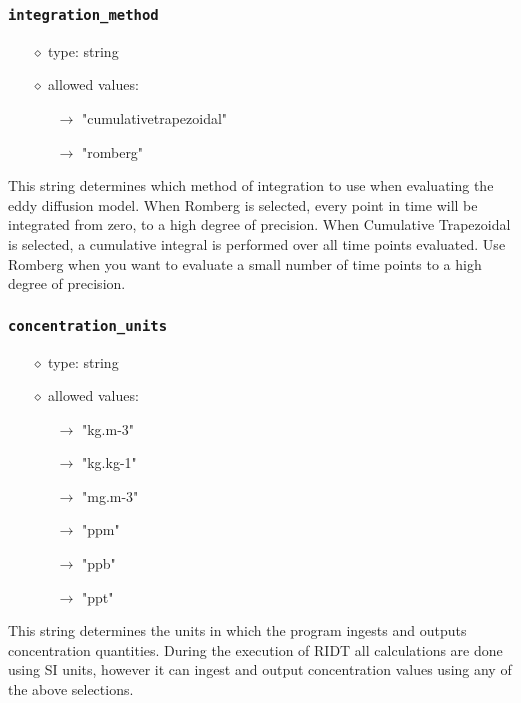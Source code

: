 \documentclass[]{article}
\def\code#1{\texttt{#1}}
\begin{document}
\subsubsection{\code{integration\_method}}\label{sec:integrationmethod}
\begin{itemize}
    \item[$\diamond$] type: string 
    \item[$\diamond$] allowed values:
    \begin{itemize}
        \item[$\rightarrow$] "cumulativetrapezoidal"
        \item[$\rightarrow$] "romberg"
    \end{itemize}
\end{itemize}
This string determines which method of integration to use when evaluating the
eddy diffusion model. When Romberg is selected, every point in time will be
integrated from zero, to a high degree of precision. When Cumulative Trapezoidal
is selected, a cumulative integral is performed over all time points evaluated.
Use Romberg when you want to evaluate a small number of time points to a high
degree of precision.


\subsubsection{\code{concentration\_units}}\label{sec:concentrationunits}
\begin{itemize}
    \item[$\diamond$] type: string 
    \item[$\diamond$] allowed values:
    \begin{itemize}
        \item[$\rightarrow$] "kg.m-3"
        \item[$\rightarrow$] "kg.kg-1"
        \item[$\rightarrow$] "mg.m-3"
        \item[$\rightarrow$] "ppm"
        \item[$\rightarrow$] "ppb"
        \item[$\rightarrow$] "ppt"
    \end{itemize}
\end{itemize}
This string determines the units in which the program ingests and outputs
concentration quantities. During the execution of RIDT all calculations are done
using SI units, however it can ingest and output concentration values using any
of the above selections.
\end{document}
